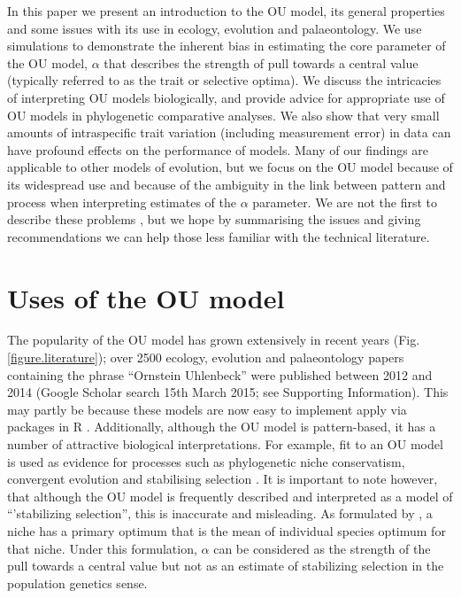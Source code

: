 \documentclass[a4paper,12pt]{article}
\begin{document}
  In this paper we present an introduction to the OU model, its general properties and some issues with its use in ecology, evolution and palaeontology.
  We use simulations to demonstrate the inherent bias in estimating the core parameter of the OU model, $\alpha$ that describes the strength of pull towards a central value (typically referred to as the trait or selective optima). We discuss the intricacies of interpreting OU models biologically, and provide advice for appropriate use of OU models in phylogenetic comparative analyses. 
  We also show that very small amounts of intraspecific trait variation (including measurement error) in data can have profound effects on the performance of models. 
  Many of our findings are applicable to other models of evolution, but we focus on the OU model because of its widespread use and because of the ambiguity in the link between pattern and process when interpreting estimates of the $\alpha$ parameter. 
  We are not the first to describe these problems \citep[e.g.,][]{ho2013asymptotic,ho2014intrinsic,boettiger2012your,hansen2012interpreting,ives2010phylogenetic}, but we hope by summarising the issues and giving recommendations we can help those less familiar with the technical literature.

\section{Uses of the OU model}
  The popularity of the OU model has grown extensively in recent years (Fig. \ref{figure.literature}); over 2500 ecology, evolution and palaeontology papers containing the phrase ``Ornstein Uhlenbeck'' were published between 2012 and 2014 (Google Scholar search 15th March 2015; see Supporting Information).
  This may partly be because these models are now easy to implement apply via packages in R \citep[e.g. ouch, GEIGER and OUwie;][]{Butler:2004aa,Harmon:2008aa,beaulieu2012ouwie}. 
  Additionally, although the OU model is pattern-based, it has a number of attractive biological interpretations. 
  For example, fit to an OU model is used as evidence for processes such as phylogenetic niche conservatism, convergent evolution and stabilising selection \citep[e.g.,][]{Wiens:2010aa,christin2013anatomical,ingram2013surface}. 
  It is important to note however, that although the OU model is frequently described and interpreted as a model of ``'stabilizing selection'', this is inaccurate and misleading. As formulated by \citet{hansen1997stabilizing}, a niche has a primary optimum that is the mean of individual species optimum for that niche. 
  Under this formulation, $\alpha$ can be considered as the strength of the pull towards a central value \citep[the primary optimum;][]{hansen2012adaptive} but not as an estimate of stabilizing selection in the population genetics sense. 
\end{document}
